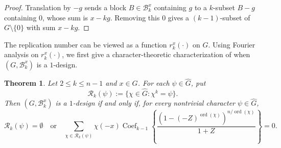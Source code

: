 \documentclass[11pt]{article}
\newtheorem{theorem}{Theorem}[section]
\theoremstyle{definition}
\DeclareMathOperator{\ord}{ord}
\newcommand{\cB}{\mathcal B}
\begin{document}
\begin{proof}
	Translation by \(-g\) sends a block \(B\in\cB_k^x\) containing \(g\)
	to a \(k\)-subset \(B-g\) containing \(0\), whose sum is \(x-kg\).  Removing
	this \(0\) gives a \((k-1)\)-subset of \(G\setminus\{0\}\) with sum \(x-kg\).
\end{proof}

The replication number can be viewed as a function $r_k^x(\cdot)$ on $G$. Using Fourier analysis on $r_k^x(\cdot)$, we first give a character-theoretic characterization of when $(G,\cB_k^x)$ is a $1$-design.

\begin{theorem}\label{thm:one-design-criterion}
	Let \(2\le k\le n-1\) and \(x\in G\).  For each
	\(\psi\in\widehat G\), put
	\[
	\mathcal R_k(\psi)
	:=
	\{\chi\in\widehat G:\chi^k=\psi\}.
	\]
	Then \((G,\cB_k^x)\) is a \(1\)-design if and only if, for every
	nontrivial character \(\psi\in\widehat G\),
	\begin{equation}\label{eq:one-design-criterion}
		\mathcal R_k(\psi)=\emptyset
		\quad\text{or}\quad
		\sum_{\chi\in\mathcal R_k(\psi)}
		\chi(-x)
		\operatorname{Coef}_{k-1}\left\{
		\frac{(1-(-Z)^{\ord(\chi)})^{n/\ord(\chi)}}{1+Z}\right\}
		=0.
	\end{equation}
\end{theorem}
\end{document}
